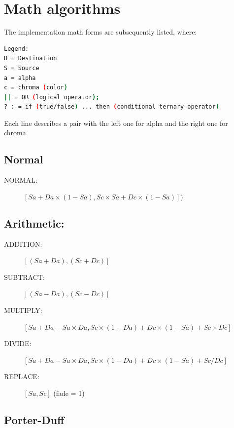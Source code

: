 \section{Math algorithms}%
\label{sec:math_algorithms}

The implementation math forms are subsequently listed, where:

\vspace{2ex}
\begin{lstlisting}[language=bash, numbers=none]
Legend:
D = Destination
S = Source
a = alpha
c = chroma (color)
|| = OR (logical operator); 
? : = if (true/false) ... then (conditional ternary operator)
\end{lstlisting}

Each line describes a pair with the left one for alpha and the right one for chroma.

\subsection*{Normal}%
\label{sub:normal}

\begin{description}
    \item[NORMAL:] $[Sa + Da \times (1 - Sa), Sc \times Sa + Dc \times(1 - Sa)])$
\end{description}

\subsection*{Arithmetic:}%
\label{sub:arithmetic}

\begin{description}
    \item[ADDITION:] $[(Sa + Da), (Sc + Dc)]$
    \item[SUBTRACT:] $[(Sa - Da), (Sc - Dc)]$
    \item[MULTIPLY:] $[Sa + Da - Sa \times Da, Sc\times(1 - Da) + Dc\times (1 - Sa) + Sc \times Dc]$
    \item[DIVIDE:] $[Sa + Da - Sa \times Da, Sc\times(1 - Da) + Dc \times (1 - Sa) + Sc/Dc]$
    \item[REPLACE:] $[Sa, Sc]$ (fade = 1)
\end{description}

\subsection*{Porter-Duff}%
\label{sub:porter-duff}

